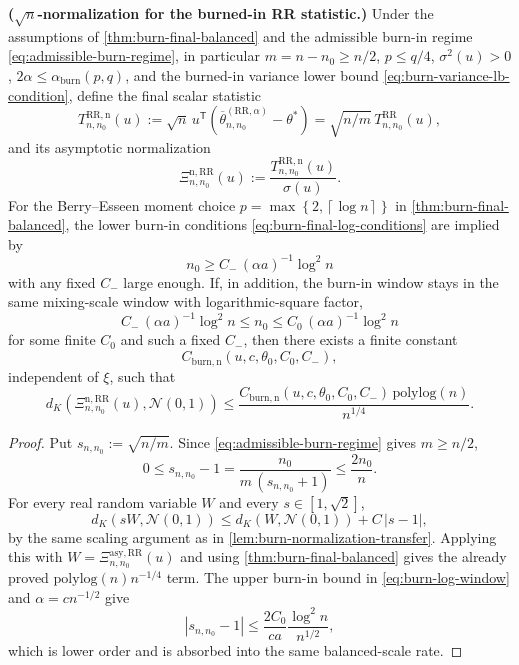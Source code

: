 \begin{corollary}\label{cor:burn-sqrt-n-transfer}
  \textbf{($\sqrt{n}$-normalization for the burned-in RR statistic.)}
  Under the assumptions of \cref{thm:burn-final-balanced} and the admissible
  burn-in regime \eqref{eq:admissible-burn-regime}, in particular
  $m = n - n_{0} \ge n / 2$, $p \le q / 4$, $\sigma^{2}(u) > 0$,
  $2 \alpha \le \alpha_{\mathrm{burn}}(p,q)$, and the burned-in variance lower bound
  \eqref{eq:burn-variance-lb-condition}, define the final scalar statistic
  \[
T_{n,n_{0}}^{\mathrm{RR,n}}(u)
    := \sqrt{n} \, u^{\mathsf{T}} \left( \overline{\theta}_{n,n_{0}}^{(\mathrm{RR}, \alpha)} - \theta^{*} \right)
    = \sqrt{n / m} \, T_{n,n_{0}}^{\mathrm{RR}}(u),
\]
  and its asymptotic normalization
  \[
\Xi_{n,n_{0}}^{\mathrm{n,RR}}(u)
    := \frac{T_{n,n_{0}}^{\mathrm{RR,n}}(u)}{\sigma(u)}.
\]
  For the Berry--Esseen moment choice $p = \max\left\{2, \left\lceil \log n \right\rceil\right\}$ in
  \cref{thm:burn-final-balanced}, the lower burn-in conditions
  \eqref{eq:burn-final-log-conditions} are implied by
  \[
n_{0} \ge C_{-} \, (\alpha a)^{-1} \log^{2} n
\]
  with any fixed $C_{-}$ large enough.
  If, in addition, the burn-in window stays in the same mixing-scale window
  with logarithmic-square factor,
  \begin{equation}
C_{-} \, (\alpha a)^{-1} \log^{2} n
    \le n_{0}
    \le C_{0} \, (\alpha a)^{-1} \log^{2} n
\label{eq:burn-log-window}
\end{equation}
  for some finite $C_{0}$ and such a fixed $C_{-}$, then there exists a finite constant
  \[
    C_{\mathrm{burn,n}}(u,c,\theta_0,C_0,C_-),
  \]
  independent of $\xi$, such that
  \begin{equation}
d_{K} \left( \Xi_{n,n_{0}}^{\mathrm{n,RR}}(u), \mathcal{N}(0, 1) \right)
    \le \frac{C_{\mathrm{burn,n}}(u,c,\theta_{0},C_{0},C_{-}) \, \mathrm{polylog}(n)}{n^{1 / 4}}.
\label{eq:burn-sqrt-n-final}
\end{equation}
\end{corollary}

\begin{proof} Put $s_{n,n_{0}} := \sqrt{n / m}$. Since
\eqref{eq:admissible-burn-regime} gives $m \ge n / 2$,
\[
0 \le s_{n,n_{0}} - 1
  = \frac{n_{0}}{m \, (s_{n,n_{0}} + 1)}
  \le \frac{2 n_{0}}{n}.
\]
For every real random variable $W$ and every $s \in [1, \sqrt{2}]$,
\[
d_{K} \left( s W, \mathcal{N}(0, 1) \right)
  \le d_{K} \left( W, \mathcal{N}(0, 1) \right) + C \, |s - 1|,
\]
by the same scaling argument as in \cref{lem:burn-normalization-transfer}. Applying
this with $W = \Xi_{n,n_{0}}^{\mathrm{asy,RR}}(u)$ and using
\cref{thm:burn-final-balanced} gives the already proved
$\mathrm{polylog}(n) n^{-1 / 4}$ term. The upper burn-in bound
in \eqref{eq:burn-log-window} and $\alpha = c n^{-1 / 2}$ give
\[
|s_{n,n_{0}} - 1|
  \le \frac{2 C_{0}}{c a} \frac{\log^{2} n}{n^{1 / 2}},
\]
which is lower order and is absorbed into the same balanced-scale rate.
\end{proof}

